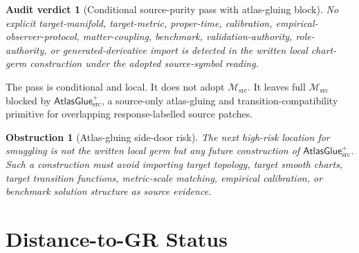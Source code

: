 \documentclass[11pt]{article}
\newcommand{\Msrc}{\mathcal{M}_{\mathrm{src}}}
\newcommand{\AtlasGlue}{\mathsf{AtlasGlue}_{\mathrm{src}}^{+}}
\newtheorem{auditverdict}{Audit verdict}
\newtheorem{obstruction}{Obstruction}
\begin{document}
\begin{auditverdict}[Conditional source-purity pass with atlas-gluing block]
No explicit target-manifold, target-metric, proper-time, calibration,
empirical-observer-protocol, matter-coupling, benchmark, validation-authority,
role-authority, or generated-derivative import is detected in the written
local chart-germ construction under the adopted source-symbol reading.
\end{auditverdict}

The pass is conditional and local. It does not adopt \(\Msrc\). It leaves full
\(\Msrc\) blocked by \(\AtlasGlue\), a source-only atlas-gluing and
transition-compatibility primitive for overlapping response-labelled source
patches.

\begin{obstruction}[Atlas-gluing side-door risk]
The next high-risk location for smuggling is not the written local germ but any
future construction of \(\AtlasGlue\). Such a construction must avoid importing
target topology, target smooth charts, target transition functions,
metric-scale matching, empirical calibration, or benchmark solution structure
as source evidence.
\end{obstruction}

\section{Distance-to-GR Status}
\end{document}
